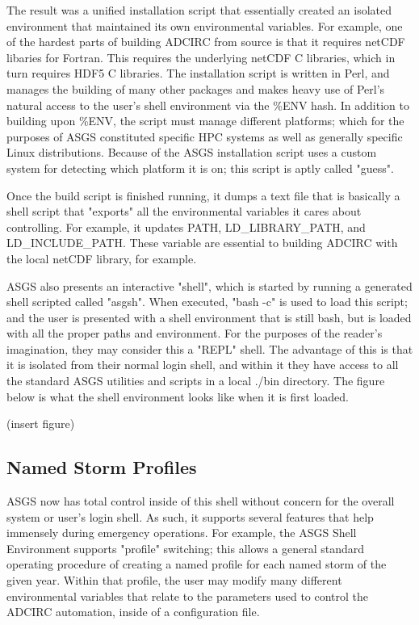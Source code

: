 \documentclass{article}
\begin{document}
The result was a unified installation script that essentially created an
isolated environment that maintained its own environmental variables. For
example, one of the hardest parts of building ADCIRC from source is that it
requires netCDF libaries for Fortran. This requires the underlying netCDF C
libraries, which in turn requires HDF5 C libraries.  The installation script is
written in Perl, and manages the building of many other packages and makes heavy
use of Perl's natural access to the user's shell environment via the \%ENV hash.
In addition to building upon \%ENV, the script must manage different platforms;
which for the purposes of ASGS constituted specific HPC systems as well as
generally specific Linux distributions. Because of the ASGS installation script
uses a custom system for detecting which platform it is on; this script is aptly
called "guess".

Once the build script is finished running, it dumps a text file that is
basically a shell script that "exports" all the environmental variables it cares
about controlling. For example, it updates PATH, LD\_LIBRARY\_PATH, and
LD\_INCLUDE\_PATH. These variable are essential to building ADCIRC with the local
netCDF library, for example.

ASGS also presents an interactive "shell", which is started by running a
generated shell scripted called "asgsh". When executed, "bash -c" is used to
load this script; and the user is presented with a shell environment that is
still bash, but is loaded with all the proper paths and environment. For the
purposes of the reader's imagination, they may consider this a "REPL" shell. The
advantage of this is that it is isolated from their normal login shell, and
within it they have access to all the standard ASGS utilities and scripts in a
local ./bin directory. The figure below is what the shell environment looks like
when it is first loaded.

(insert figure)

\subsection{Named Storm Profiles}

ASGS now has total control inside of this shell without concern for the overall
system or user's login shell. As such, it supports several features that help
immensely during emergency operations. For example, the ASGS Shell Environment
supports "profile" switching; this allows a general standard operating procedure
of creating a named profile for each named storm of the given year. Within that
profile, the user may modify many different environmental variables that relate
to the parameters used to control the ADCIRC automation, inside of a
configuration file.
\end{document}
